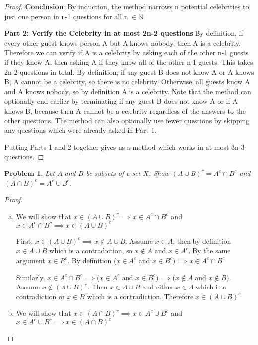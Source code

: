 \documentclass[11pt]{article}
\newtheorem{problem}{Problem}
\theoremstyle{definition}
\theoremstyle{case}
\begin{document}
\begin{proof}
    \textbf{Conclusion}: By induction, the method narrows n potential celebrities
    to just one person in n-1 questions for all n $\in \mathbb{N}$

    \textbf{Part 2: Verify the Celebrity in at most 2n-2 questions}
    By definition, if every other guest knows person A but A knows nobody, then
    A is a celebrity. Therefore we can verify if A is a celebrity by asking 
    each of the other n-1 guests if they know A, then asking A if they know
    all of the other n-1 guests. This takes 2n-2 questions in total.
    By definition, if any guest B does not know A or A knows B,
    A cannot be a celebrity, so there is no celebrity.
    Otherwise, all guests know A and A knows nobody, so by definition A is
    a celebrity. Note that the method can optionally end earlier by
    terminating if any guest B does not know A or if A knows B, because
    then A cannot be a celebrity regardless of the answers to 
    the other questions. The method
    can also optionally use fewer questions by skipping any questions which were already
    asked in Part 1.

    Putting Parts 1 and 2 together gives us a method which works in at most 3n-3 questions.

\end{proof}

\begin{problem}
Let $A$ and $B$ be subsets of a set $X$. Show $(A\cup B)^c=A^c\cap B^c$ and $(A\cap B)^c=A^c\cup B^c$.
\end{problem}

\begin{proof}
    \begin{enumerate}[(a)]
        \item We will show that $x \in (A \cup B)^c \implies x \in A^c \cap B^c$ 
        and $x \in A^c \cap B^c \implies x \in (A \cup B)^c$

        First, $x \in (A \cup B)^c \implies x \notin A \cup B$.
        Assume $x \in A$, then by definition $x \in A \cup B$ which is a contradiction,
        so $x \notin A$ and $x \in A^c$. By the same argument $x \in B^c$. By definition 
        ($x \in A^c$ and $x \in B^c) \implies x \in A^c \cap B^c$

        Similarly, $x \in A^c \cap B^c \implies (x \in A^c$ and $x \in B^c) 
        \implies (x \notin A$ and $x \notin B)$. Assume $x \notin (A \cup B)^c$. Then 
        $x \in A \cup B$ and either $x \in A$ which is a contradiction or $x \in B$ which
        is a contradiction. Therefore $x \in (A \cup B)^c$

        \item We will show that $x \in (A \cap B)^c \implies x \in A^c \cup B^c$ 
        and $x \in A^c \cup B^c \implies x \in (A \cap B)^c$


    \end{enumerate}
\end{proof}
\end{document}
